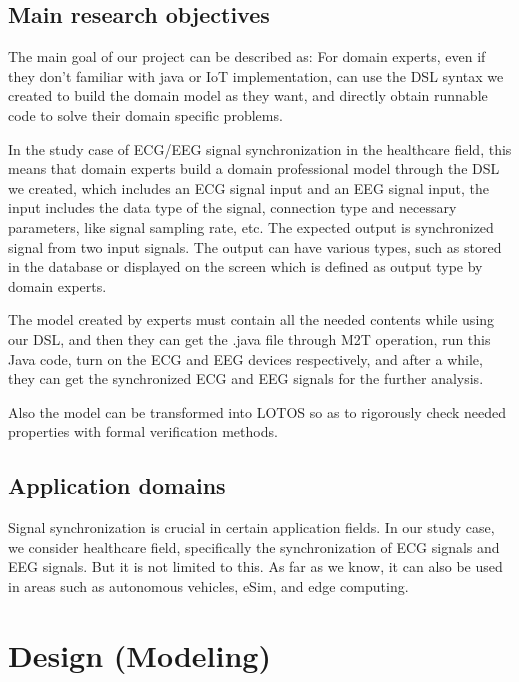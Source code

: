 \documentclass[11pt, oneside]{article}   	%
\begin{document}
\subsection{Main research objectives}
\indent \par The main goal of our project can be described as: For domain experts, even if they don't familiar with java or IoT implementation, can use the DSL syntax we created to build the domain model as they want, and directly obtain runnable code to solve their domain specific problems.\par
\indent \par In the study case of ECG/EEG signal synchronization in the healthcare field, this means that domain experts build a domain professional model through the DSL we created, which includes an ECG signal input and an EEG signal input, the input includes the data type of the signal, connection type and necessary parameters, like signal sampling rate, etc. The expected output is synchronized signal from two input signals. The output can have various types, such as stored in the database or displayed on the screen which is defined as output type by domain experts. \\
\indent \par The model created by experts must contain all the needed contents while using our DSL, and then they can get the .java file through M2T operation, run this Java code, turn on the ECG and EEG devices respectively, and after a while, they can get the synchronized ECG and EEG signals for the further analysis.\par
\indent \par Also the model can be transformed into LOTOS so as to rigorously check needed properties with formal verification methods. 


\subsection{Application domains}
\indent \par Signal synchronization is crucial in certain application fields. In our study case, we consider healthcare field, specifically the synchronization of ECG signals and EEG signals. But it is not limited to this. As far as we know, it can also be used in areas such as autonomous vehicles, eSim, and edge computing.


\section{Design (Modeling)}
\end{document}
